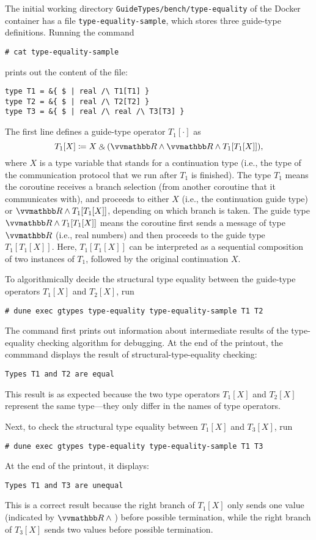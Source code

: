 The initial working directory \texttt{GuideTypes/bench/type-equality} of the
Docker container has a file \texttt{type-equality-sample}, which stores three
guide-type definitions.
%
Running the command
\begin{verbatim}
# cat type-equality-sample
\end{verbatim}
prints out the content of the file:
\begin{verbatim}
type T1 = &{ $ | real /\ T1[T1] }
type T2 = &{ $ | real /\ T2[T2] }
type T3 = &{ $ | real /\ real /\ T3[T3] }
\end{verbatim}
%
The first line defines a guide-type operator $T_1 [\cdot]$ as
\begin{equation*}
  T_1 [X] \coloneq X \echoice (\treal \land \treal \land T_1 [T_1[X]]),
\end{equation*}
where $X$ is a type variable that stands for a continuation type (i.e., the type
of the communication protocol that we run after $T_1$ is finished).
%
The type $T_1$ means the coroutine receives a branch selection (from another
coroutine that it communicates with), and proceeds to either $X$ (i.e., the
continuation guide type) or $\treal \land T_1 [T_1[X]]$, depending on which
branch is taken.
%
The guide type $\treal \land T_1 [T_1[X]]$ means the coroutine first sends a
message of type $\treal$ (i.e., real numbers) and then proceeds to the guide
type $T_1 [T_1 [X]]$.
%
Here, $T_1 [T_1 [X]]$ can be interpreted as a sequential composition of two
instances of $T_1$, followed by the original continuation $X$.

To algorithmically decide the structural type equality between the guide-type
operators $T_1 [X]$ and $T_2 [X]$, run
\begin{verbatim}
# dune exec gtypes type-equality type-equality-sample T1 T2
\end{verbatim}
%
The command first prints out information about intermediate results of the
type-equality checking algorithm for debugging.
%
At the end of the printout, the commmand displays the result of
structural-type-equality checking:
\begin{verbatim}
Types T1 and T2 are equal
\end{verbatim}
%
This result is as expected because the two type operators $T_1 [X]$ and $T_2
  [X]$ represent the same type---they only differ in the names of type operators.

Next, to check the structural type equality between $T_1 [X]$ and $T_3 [X]$, run
\begin{verbatim}
# dune exec gtypes type-equality type-equality-sample T1 T3
\end{verbatim}
%
At the end of the printout, it displays:
\begin{verbatim}
Types T1 and T3 are unequal
\end{verbatim}
%
This is a correct result because the right branch of $T_1 [X]$ only sends one
value (indicated by $\treal \land {}$) before possible termination, while the
right branch of $T_3 [X]$ sends two values before possible termination.

